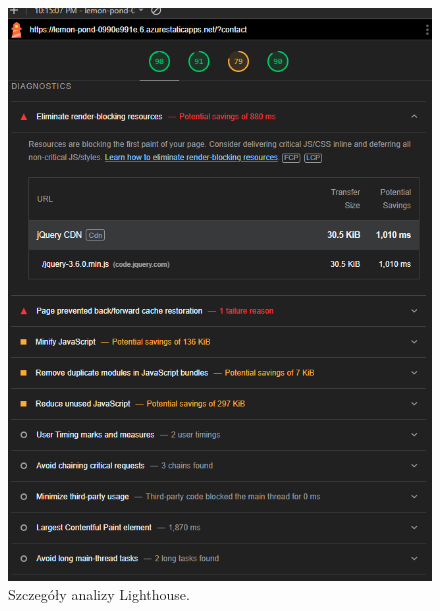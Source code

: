 \documentclass[a4paper,12pt]{article}
\begin{document}
\begin{figure}[H]
    \centering
    \includegraphics[width=1\textwidth]{images/lighthouse_details.png}
    \caption{Szczegóły analizy Lighthouse.}
\end{figure}
\end{document}
